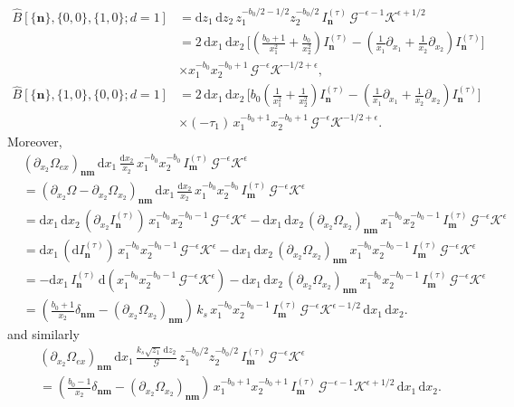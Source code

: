\documentclass[a4paper,12pt]{article}
\newcommand{\n}{\nonumber}
\def\di{{\mathrm{d}}}
\def\ep{\epsilon}
\newcommand{\mG}{\mathcal{G}}
\newcommand{\mK}{\mathcal{K}}
\begin{document}
\begin{align}
	\hat{B}[\{\bm n\},\{0,0\},\{1,0\};d=1]
	&= \di z_1\,\di z_2\,z_1^{-b_0/2-1/2}z_2^{-b_0/2}\,I^{(\tau)}_{\bm n}\,\mG^{-\ep-1}\mK^{\ep+1/2} \n\\
	&=2\,\di x_1\,\di x_2\,\Bigg[\left(\frac{b_{0}+1}{x_1^2}+\frac{b_{0}}{x_2^2}\right)I^{(\tau)}_{\bm n}
	-\left(\frac{1}{x_1}\partial_{x_1}+\frac{1}{x_2}\partial_{x_2}\right)I^{(\tau)}_{\bm n}\Bigg]\n\\
	&\times x_1^{-b_0}x_2^{-b_0+1}\,\mG^{-\ep}\mK^{-1/2+\ep}, \n\\
	\hat{B}[\{\bm n\},\{1,0\},\{0,0\};d=1]
	&=2\,\di x_1\,\di x_2\,\Bigg[b_0\left(\frac{1}{x_1^2}+\frac{1}{x_2^2}\right)I^{(\tau)}_{\bm n}
	-\left(\frac{1}{x_1}\partial_{x_1}+\frac{1}{x_2}\partial_{x_2}\right)I^{(\tau)}_{\bm n}\Bigg]\n\\
	&\times (-\tau_1)\,x_1^{-b_0+1}x_2^{-b_0+1}\,\mG^{-\ep}\mK^{-1/2+\ep}.
\end{align}
Moreover,
\begin{align*}
	&(\partial_{x_2}\Omega_{ex})_{\bm n \bm m}\,\di x_1\,\frac{\di x_2}{x_2}\,x_1^{-b_0}x_2^{-b_0}\,I^{(\tau)}_{\bm m}\,\mG^{-\ep}\mK^{\ep} \n\\
	&= (\partial_{x_2}\Omega-\partial_{x_2}\Omega_{x_2})_{\bm n \bm m}\,\di x_1\,\frac{\di x_2}{x_2}\,x_1^{-b_0}x_2^{-b_0}\,I^{(\tau)}_{\bm m}\,\mG^{-\ep}\mK^{\ep} \n\\
	&= \di x_1\,\di x_2\,(\partial_{x_2}I^{(\tau)}_{\bm n})\,x_1^{-b_0}x_2^{-b_0-1}\,\mG^{-\ep}\mK^{\ep} 
	- \di x_1\,\di x_2\,(\partial_{x_2}\Omega_{x_2})_{\bm n \bm m}\,x_1^{-b_0}x_2^{-b_0-1}\,I^{(\tau)}_{\bm m}\,\mG^{-\ep}\mK^{\ep} \n\\
	&= \di x_1\,(\di I^{(\tau)}_{\bm n})\,x_1^{-b_0}x_2^{-b_0-1}\,\mG^{-\ep}\mK^{\ep} 
	- \di x_1\,\di x_2\,(\partial_{x_2}\Omega_{x_2})_{\bm n \bm m}\,x_1^{-b_0}x_2^{-b_0-1}\,I^{(\tau)}_{\bm m}\,\mG^{-\ep}\mK^{\ep} \n\\
	&= -\di x_1\,I^{(\tau)}_{\bm n}\,\di\!\left( x_1^{-b_0}x_2^{-b_0-1}\,\mG^{-\ep}\mK^{\ep} \right) 
	- \di x_1\,\di x_2\,(\partial_{x_2}\Omega_{x_2})_{\bm n \bm m}\,x_1^{-b_0}x_2^{-b_0-1}\,I^{(\tau)}_{\bm m}\,\mG^{-\ep}\mK^{\ep} \n\\
	&= \left(\frac{b_0+1}{x_2}\delta_{\bm n \bm m}-(\partial_{x_2}\Omega_{x_2})_{\bm n \bm m}\right)\,k_s\,x_1^{-b_0}x_2^{-b_0-1}\,I^{(\tau)}_{\bm m}\,\mG^{-\ep}\mK^{\ep-1/2}\,\di x_1\,\di x_2.
\end{align*}
and similarly
\begin{align*}
	&(\partial_{x_2}\Omega_{ex})_{\bm n \bm m}\,\di x_1\,\frac{k_s\sqrt{z_1}\,\di z_2}{\mG}\,z_1^{-b_0/2}z_2^{-b_0/2}\,I^{(\tau)}_{\bm m}\,\mG^{-\ep}\mK^{\ep} \n\\
	&= \left(\frac{b_0-1}{x_2}\delta_{\bm n \bm m}-(\partial_{x_2}\Omega_{x_2})_{\bm n \bm m}\right)\,x_1^{-b_0+1}x_2^{-b_0+1}\,I^{(\tau)}_{\bm m}\,\mG^{-\ep-1}\mK^{\ep+1/2}\,\di x_1\,\di x_2.
\end{align*}
\end{document}
